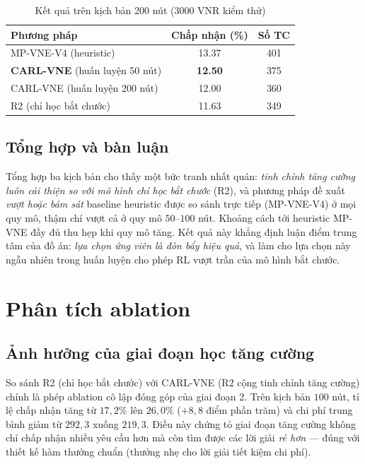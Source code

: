 \documentclass[../DoAn.tex]{subfiles}
\begin{document}
\begin{table}[H]
\centering
\caption{Kết quả trên kịch bản 200 nút ($3000$ VNR kiểm thử)}
\label{tab:res200}
\begin{tabular}{lcc}
\toprule
\textbf{Phương pháp} & \textbf{Chấp nhận (\%)} & \textbf{Số TC} \\
\midrule
MP-VNE-V4 (heuristic)                 & 13.37 & 401 \\
\textbf{CARL-VNE} (huấn luyện 50 nút) & \textbf{12.50} & 375 \\
CARL-VNE (huấn luyện 200 nút)     & 12.00 & 360 \\
R2 (chỉ học bắt chước)                & 11.63 & 349 \\
\bottomrule
\end{tabular}
\end{table}

\subsection{Tổng hợp và bàn luận}
\label{subsec:res-summary}

Tổng hợp ba kịch bản cho thấy một bức tranh nhất quán: \textit{tinh chỉnh tăng cường luôn cải thiện so với mô hình chỉ học bắt chước} (R2), và phương pháp đề xuất \textit{vượt hoặc bám sát} baseline heuristic được so sánh trực tiếp (MP-VNE-V4) ở mọi quy mô, thậm chí vượt cả ở quy mô $50$–$100$ nút. Khoảng cách tới heuristic MP-VNE đầy đủ thu hẹp khi quy mô tăng. Kết quả này khẳng định luận điểm trung tâm của đồ án: \textit{lựa chọn ứng viên là đòn bẩy hiệu quả}, và làm cho lựa chọn này ngẫu nhiên trong huấn luyện cho phép RL vượt trần của mô hình bắt chước.

\section{Phân tích ablation}                %
\label{sec:ablation}

\subsection{Ảnh hưởng của giai đoạn học tăng cường}
\label{subsec:abl-rl}

So sánh R2 (chỉ học bắt chước) với CARL-VNE (R2 cộng tinh chỉnh tăng cường) chính là phép ablation cô lập đóng góp của giai đoạn 2. Trên kịch bản $100$ nút, tỉ lệ chấp nhận tăng từ $17{,}2\%$ lên $26{,}0\%$ ($+8{,}8$ điểm phần trăm) và chi phí trung bình giảm từ $292{,}3$ xuống $219{,}3$. Điều này chứng tỏ giai đoạn tăng cường không chỉ chấp nhận nhiều yêu cầu hơn mà còn tìm được các lời giải \textit{rẻ hơn} — đúng với thiết kế hàm thưởng chuẩn (thưởng nhẹ cho lời giải tiết kiệm chi phí).
\end{document}
